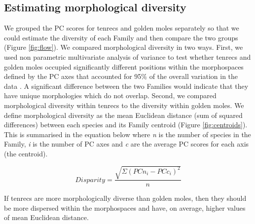\documentclass[12pt,a4paper]{article}
\begin{document}
\subsection{Estimating morphological diversity}
	
	We grouped the PC scores for tenrecs and golden moles separately so that we could estimate the diversity of each Family and then compare the two groups (Figure \ref{fig:flow}). We compared morphological diversity in two ways. First, we used non parametric multivariate analysis of variance \citep[npMANOVA;][]{Anderson2001} to test whether tenrecs and golden moles occupied significantly different positions within the morphospaces defined by the PC axes that accounted for 95\% of the overall variation in the data \citep[e.g.][]{Serb2011, Ruta2013}. A significant difference between the two Families would indicate that they have unique morphologies which do not overlap. Second, we compared morphological diversity within tenrecs to the diversity within golden moles. We define morphological diversity as the mean Euclidean distance (sum of squared differences) between each species and its Family centroid (Figure \ref{fig:centroids}). This is summarised in the equation below where \textit{n} is the number of species in the Family, \textit{i} is the number of PC axes and \textit{c} are the average PC scores for each axis (the centroid). 
	
	\begin{equation}
	Disparity = \frac{\sqrt{\Sigma(PCn_{i}-PCc_{i})^2}}{n}
	\end{equation}


	If tenrecs are more morphologically diverse than golden moles, then they should be more dispersed within the morphospaces and have, on average, higher values of mean Euclidean distance. 	
\end{document}

